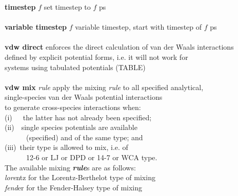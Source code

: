 \begin{tabbing}
\> {\bf timestep} $f$                           \> set timestep to $f$ ps \\
\>                                              \> \\
\> {\bf variable timestep} $f$                  \> variable timestep, start with timestep of $f$ ps \\
\>                                              \> \\
\> {\bf vdw direct}                             \> enforces the direct calculation of van der Waals interactions \\
\>                                              \> defined by explicit potential forms, i.e. it will not work for \\
\>                                              \> systems using tabulated potentials (TABLE) \\
\>                                              \> \\
\> {\bf vdw mix}  {\em rule}                    \> apply the mixing {\em rule} to all specified analytical, \\
\>                                              \> single-species van der Waals potential interactions \\
\>                                              \> to generate cross-species interactions when: \\
\>                                              \> \phantom{x} (i)~~~the latter has not already been specified; \\
\>                                              \> \phantom{x} (ii)~~single species potentials are available \\
\>                                              \> \phantom{x} ~~~~~~(specified) and of the same type; and \\
\>                                              \> \phantom{x} (iii)~their type is allowed to mix, i.e. of \\
\>                                              \> \phantom{x} ~~~~~~12-6 or LJ or DPD or 14-7 or WCA type. \\
\>                                              \> The available mixing {\bf \em rule}s are as follows: \\
\>                                              \> \phantom{x} {\em lore}ntz for the Lorentz-Berthelot type of mixing \\
\>                                              \> \phantom{x} {\em fend}er for the Fender-Halsey type of mixing \\

\end{tabbing}
